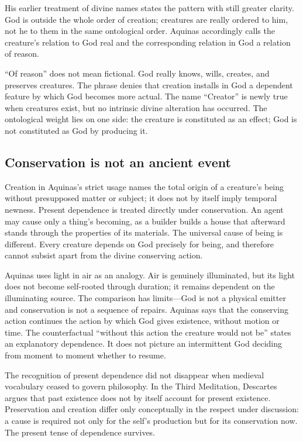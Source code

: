 His earlier treatment of divine names states the pattern with still greater clarity. God is outside the whole order of creation; creatures are really ordered to him, not he to them in the same ontological order. Aquinas accordingly calls the creature's relation to God real and the corresponding relation in God a relation of reason.

``Of reason'' does not mean fictional. God really knows, wills, creates, and preserves creatures. The phrase denies that creation installs in God a dependent feature by which God becomes more actual. The name ``Creator'' is newly true when creatures exist, but no intrinsic divine alteration has occurred. The ontological weight lies on one side: the creature is constituted as an effect; God is not constituted as God by producing it.

\subsection{Conservation is not an ancient event}

Creation in Aquinas's strict usage names the total origin of a creature's being without presupposed matter or subject; it does not by itself imply temporal newness. Present dependence is treated directly under conservation. An agent may cause only a thing's becoming, as a builder builds a house that afterward stands through the properties of its materials. The universal cause of being is different. Every creature depends on God precisely for being, and therefore cannot subsist apart from the divine conserving action.

Aquinas uses light in air as an analogy. Air is genuinely illuminated, but its light does not become self-rooted through duration; it remains dependent on the illuminating source. The comparison has limits---God is not a physical emitter and conservation is not a sequence of repairs. Aquinas says that the conserving action continues the action by which God gives existence, without motion or time. The counterfactual ``without this action the creature would not be'' states an explanatory dependence. It does not picture an intermittent God deciding from moment to moment whether to resume.

The recognition of present dependence did not disappear when medieval vocabulary ceased to govern philosophy. In the Third Meditation, Descartes argues that past existence does not by itself account for present existence. Preservation and creation differ only conceptually in the respect under discussion: a cause is required not only for the self's production but for its conservation now. The present tense of dependence survives.

